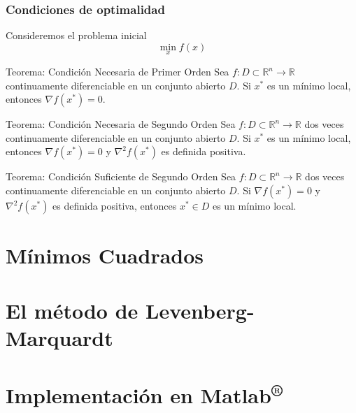 \documentclass{beamer}
\begin{document}
\begin{frame}
    \frametitle{Condiciones de optimalidad}
    Consideremos el problema inicial
    \begin{equation*}
        \min_x f(x)
    \end{equation*}\pause
    \vspace{-0.5cm}
    \begin{block}{Teorema: Condición Necesaria de Primer Orden}
        Sea $f:D\subset \mathbb{R}^n \rightarrow \mathbb{R}$ continuamente diferenciable en un
        conjunto abierto $D$. Si $x^*$ es un mínimo local, entonces
        $\nabla f(x^*) = 0$.
    \end{block}\pause

    \begin{block}
        {Teorema: Condición Necesaria de Segundo Orden}
        Sea $f:D\subset \mathbb{R}^n \rightarrow \mathbb{R}$ dos veces continuamente diferenciable
        en un conjunto abierto $D$. Si $x^*$ es un mínimo local, entonces
        $\nabla f(x^*) = 0$ y $\nabla^2 f(x^*)$ es definida positiva.
    \end{block}\pause
    
    \begin{block}{Teorema: Condición Suficiente de Segundo Orden}
        Sea $f:D\subset \mathbb{R}^n \rightarrow \mathbb{R}$ dos veces continuamente diferenciable
        en un conjunto abierto $D$. Si $\nabla f(x^*) = 0$ y $\nabla^2 f(x^*)$ es definida positiva,
        entonces $x^* \in D$ es un mínimo local.
    \end{block}
\end{frame}
\section{Mínimos Cuadrados}


\section{El método de Levenberg-Marquardt}


\section{Implementación en Matlab\textsuperscript{®}}
\end{document}
